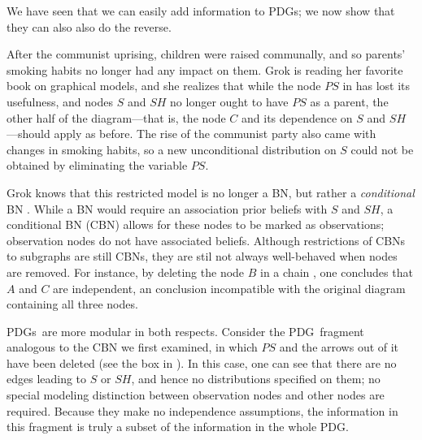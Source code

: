 \documentclass{article}
\newcommand{\MN}{PDG}
\newcommand{\MNs}{\MN s}
\numberwithin{equation}{section}
\begin{document}
	We have seen that we can easily add information to \MNs; we now show that they can also also do the reverse.  

	\begin{example}[restriction]\label{ex:grok-ablate}
		After the communist uprising, children were raised communally, and so parents' smoking habits no longer had any impact on them. Grok is reading her favorite book on graphical models, and she realizes that while the node $\mathit{PS}$ in  has lost its usefulness, and nodes $S$ and $\mathit{SH}$ no longer ought to have $\mathit{PS}$ as a parent, the other half of the diagram---that is, the node $C$ and its dependence on $S$ and $\mathit{SH}$---should apply as before.
		{\color{gray} The rise of the communist party also came with changes in smoking habits, so a new unconditional distribution on $S$ could not be obtained by eliminating the variable $PS$. }
		
		Grok knows that this restricted model is no longer a BN, but rather a \emph{conditional} BN \parencite{koller2009probabilistic}. While a BN would require an association prior beliefs with $S$ and $\mathit{SH}$, a conditional BN (CBN) allows for these nodes to be marked as observations; observation nodes do not have associated beliefs. 
		Although restrictions of CBNs to subgraphs are still CBNs, they are stil not always well-behaved when nodes are removed. For instance, by deleting the node $B$ in a chain 
		\scalebox{0.6}{
		\begin{tikzcd}[dpad={light pad}, column sep = 1.3em, AmpRep]
			A \ar[r] \& B \ar[r] \& C
		\end{tikzcd}},
		one concludes that $A$ and $C$ are independent, an conclusion incompatible with the original diagram containing all three nodes.  
		
		\MNs\ are more modular in both respects. Consider the \MN\ fragment analogous to the CBN we first examined, in which $\mathit{PS}$ and the arrows out of it have been deleted (see the box in ). In this case, one can see that there are no edges leading to $S$ or $\mathit{SH}$, and hence no distributions specified on them; no special modeling distinction between observation nodes and other nodes are required. 
		Because they make no independence assumptions, the information in this fragment is truly a subset of the information in the whole \MN. 		
	\end{example}
	
\end{document}
